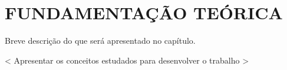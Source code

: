 \chapter{FUNDAMENTAÇÃO TEÓRICA}

Breve descrição do que será apresentado no capítulo. 

< Apresentar os conceitos estudados para desenvolver o trabalho >